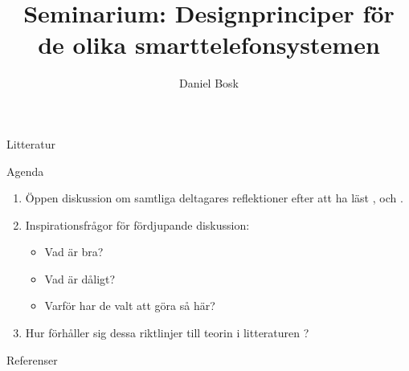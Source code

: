\documentclass{beamer}
\title{%
  Seminarium: Designprinciper för de olika smarttelefonsystemen
}
\author{Daniel Bosk}
\institute[MIUN ITM]{%
  Avdelningen för informations- och kommunikationssytem (IKS),\\
  Mittuniversitetet, Sundsvall.
}
\date{\svnId}
\begin{document}
\begin{frame}
  \titlepage
\end{frame}

\begin{frame}{Litteratur}
  
\end{frame}





\begin{frame}{Agenda}
  \begin{enumerate}
    \item Öppen diskussion om samtliga deltagares reflektioner efter att ha 
      läst \cite{Nokia2011n9u}, \cite{Android2012d} och \cite{Apple2012hig}.

    \item Inspirationsfrågor för fördjupande diskussion:
      \begin{itemize}
        \item Vad är bra?
        \item Vad är dåligt?
        \item Varför har de valt att göra så här?
      \end{itemize}

    \item Hur förhåller sig dessa riktlinjer till teorin i litteraturen 
      \citep{Sharp2011idb}?

  \end{enumerate}
\end{frame}



\begin{frame}{Referenser}
	\small
  
\end{frame}
\end{document}

